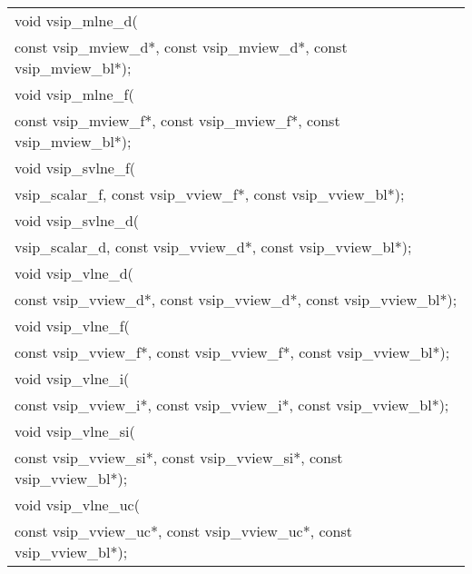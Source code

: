\\\cvsiplh
\afh
{
\ttfamily
\\\hspace*{.04\textwidth}\begin{tabular}[H]{l}
void vsip\_mlne\_d(\\*\hspace{1cm}const vsip\_mview\_d*, const vsip\_mview\_d*, const vsip\_mview\_bl*);\\
void vsip\_mlne\_f(\\*\hspace{1cm}const vsip\_mview\_f*, const vsip\_mview\_f*, const vsip\_mview\_bl*);\\
void vsip\_svlne\_f(\\*\hspace{1cm}vsip\_scalar\_f, const vsip\_vview\_f*, const vsip\_vview\_bl*);\\
void vsip\_svlne\_d(\\*\hspace{1cm}vsip\_scalar\_d, const vsip\_vview\_d*, const vsip\_vview\_bl*);\\
void vsip\_vlne\_d(\\*\hspace{1cm}const vsip\_vview\_d*, const vsip\_vview\_d*, const vsip\_vview\_bl*);\\
void vsip\_vlne\_f(\\*\hspace{1cm}const vsip\_vview\_f*, const vsip\_vview\_f*, const vsip\_vview\_bl*);\\
void vsip\_vlne\_i(\\*\hspace{1cm}const vsip\_vview\_i*, const vsip\_vview\_i*, const vsip\_vview\_bl*);\\
void vsip\_vlne\_si(\\*\hspace{1cm}const vsip\_vview\_si*, const vsip\_vview\_si*, const vsip\_vview\_bl*);\\
void vsip\_vlne\_uc(\\*\hspace{1cm}const vsip\_vview\_uc*, const vsip\_vview\_uc*, const vsip\_vview\_bl*);\\
\end{tabular}
}
\\\pyjvsiph
{}
